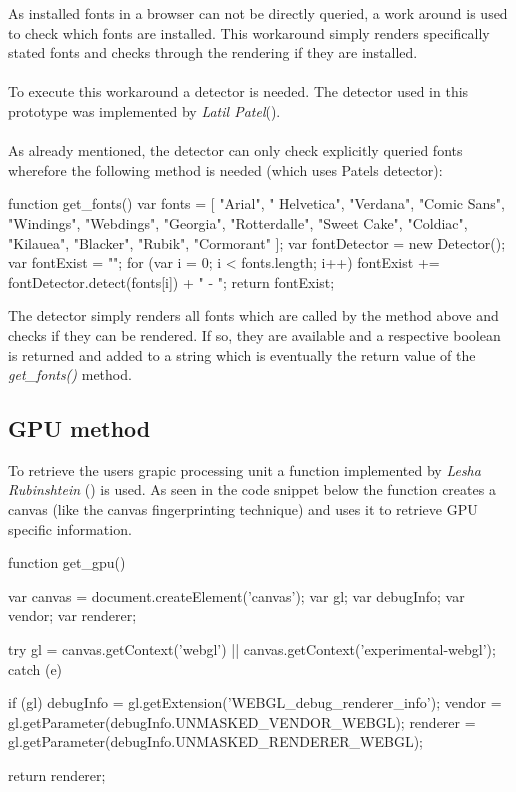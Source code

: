 As installed fonts in a browser can not be directly queried, a work around is used to check which fonts are installed. This workaround simply renders specifically stated fonts and checks through the rendering if they are installed.\\\\
To execute this workaround a detector is needed. The detector used in this prototype was implemented by \textit{Latil Patel}(\textcite{fontDetect}).\\\\
As already mentioned, the detector can only check explicitly queried fonts wherefore the following method is needed (which uses Patels detector):\\

\begin{JsCode}
	function get_fonts() {
		var fonts = [ "Arial", "	Helvetica", "Verdana", "Comic Sans",
		"Windings", "Webdings", "Georgia", "Rotterdalle", "Sweet Cake",
		"Coldiac", "Kilauea", "Blacker", "Rubik", "Cormorant" ];
		var fontDetector = new Detector();
		var fontExist = "";
		for (var i = 0; i < fonts.length; i++) {
			fontExist += fontDetector.detect(fonts[i]) + " - ";
		}
		return fontExist;
	}
\end{JsCode}
The detector simply renders all fonts which are called by the method above and checks if they can be rendered. If so, they are available and a respective boolean is returned and added to a string which is eventually the return value of the \textit{get\_fonts()} method. 

\subsection{GPU method} \label{sec:graphicCard}
To retrieve the users grapic processing unit a function implemented by \textit{Lesha Rubinshtein} (\textcite{gpuDetect}) is used. As seen in the code snippet below the function creates a canvas (like the canvas fingerprinting technique) and uses it to retrieve GPU specific information.\\

\begin{JsCode}
	function get_gpu() {
		var canvas = document.createElement('canvas');
		var gl;
		var debugInfo;
		var vendor;
		var renderer;
		
		try {
			gl = canvas.getContext('webgl')
			|| canvas.getContext('experimental-webgl');
		} catch (e) {
		}
		
		if (gl) {
			debugInfo = gl.getExtension('WEBGL_debug_renderer_info');
			vendor = gl.getParameter(debugInfo.UNMASKED_VENDOR_WEBGL);
			renderer = gl.getParameter(debugInfo.UNMASKED_RENDERER_WEBGL);
		}
		
		return renderer;
	}
	
\end{JsCode}


